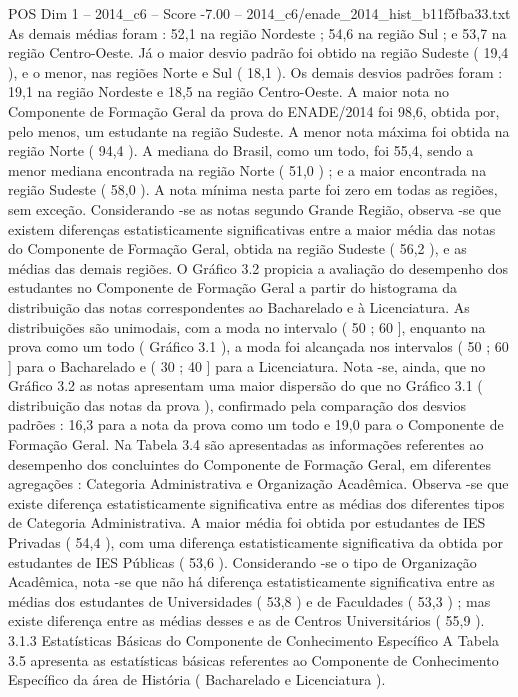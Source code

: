 \begin{textsample}{POS Dim 1 – 2014\_c6 – Score -7.00 – 2014\_c6/enade\_2014\_hist\_b11f5fba33.txt}
As demais médias foram : 52,1 na região Nordeste ; 54,6 na região Sul ; e 53,7 na região Centro-Oeste.
Já o maior desvio padrão foi obtido na região Sudeste ( 19,4 ), e o menor, nas regiões Norte e Sul ( 18,1 ).
Os demais desvios padrões foram : 19,1 na região Nordeste e 18,5 na região Centro-Oeste.
A maior nota no Componente de Formação Geral da prova do ENADE/2014 foi 98,6, obtida por, pelo menos, um estudante na região Sudeste.
A menor nota máxima foi obtida na região Norte ( 94,4 ).
A mediana do Brasil, como um todo, foi 55,4, sendo a menor mediana encontrada na região Norte ( 51,0 ) ; e a maior encontrada na região Sudeste ( 58,0 ).
A nota mínima nesta parte foi zero em todas as regiões, sem exceção.
Considerando -se as notas segundo Grande Região, observa -se que existem diferenças estatisticamente significativas entre a maior média das notas do Componente de Formação Geral, obtida na região Sudeste ( 56,2 ), e as médias das demais regiões.
O Gráfico 3.2 propicia a avaliação do desempenho dos estudantes no Componente de Formação Geral a partir do histograma da distribuição das notas correspondentes ao Bacharelado e à Licenciatura.
As distribuições são unimodais, com a moda no intervalo ( 50 ; 60 ], enquanto na prova como um todo ( Gráfico 3.1 ), a moda foi alcançada nos intervalos ( 50 ; 60 ] para o Bacharelado e ( 30 ; 40 ] para a Licenciatura.
Nota -se, ainda, que no Gráfico 3.2 as notas apresentam uma maior dispersão do que no Gráfico 3.1 ( distribuição das notas da prova ), confirmado pela comparação dos desvios padrões : 16,3 para a nota da prova como um todo e 19,0 para o Componente de Formação Geral.
Na Tabela 3.4 são apresentadas as informações referentes ao desempenho dos concluintes do Componente de Formação Geral, em diferentes agregações : Categoria Administrativa e Organização Acadêmica.
Observa -se que existe diferença estatisticamente significativa entre as médias dos diferentes tipos de Categoria Administrativa.
A maior média foi obtida por estudantes de IES Privadas ( 54,4 ), com uma diferença estatisticamente significativa da obtida por estudantes de IES Públicas ( 53,6 ).
Considerando -se o tipo de Organização Acadêmica, nota -se que não há diferença estatisticamente significativa entre as médias dos estudantes de Universidades ( 53,8 ) e de Faculdades ( 53,3 ) ; mas existe diferença entre as médias desses e as de Centros Universitários ( 55,9 ). 3.1.3 Estatísticas Básicas do Componente de Conhecimento Específico A Tabela 3.5 apresenta as estatísticas básicas referentes ao Componente de Conhecimento Específico da área de História ( Bacharelado e Licenciatura ).

\end{textsample}
